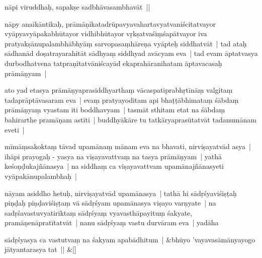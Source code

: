 \documentclass[article,12pt,a4paper]{memoir}%
\newcounter{parCount}
\begin{document}
	  
	  \pstart \leavevmode%
	\label{thakur75-101.28}nāpi viruddhaḥ, sapakṣe sadbhāvasambhavāt ||
	{}
	\pend%
      

	  
	  \pstart \leavevmode%
	\label{thakur75-101.29}nāpy anaikāntikaḥ, prāmāṇikatadrūpavyavahartavyatvaniścitatvayor vyāpyavyāpakabhūtayor vidhibhūtayor vṛkṣatvaśiṃśapātvayor iva pratyakṣānupalambhābhyāṃ sarvopasaṃhāreṇa vyāpteḥ siddhatvāt | tad ataḥ sādhanād doṣatrayarahitāt sādhyaṃ siddhyad avācyam eva | tad evam āptatvasya durbodhatvena tatpraṇītatvāniścayād ekaprahāranihatam āptavacasaḥ prāmāṇyam |
	{}
	\pend%
      

	  
	  \pstart \leavevmode%
	\label{thakur75-102.4}ato yad etasya prāmāṇyaprasiddhyarthaṃ vācaspatiprabhṛtīnāṃ valgitaṃ tadaprāptāvasaram eva | evaṃ pratyayoditam api bhaṭṭābhimataṃ śābdaṃ prāmāṇyaṃ vyastam iti boddhavyam | tasmāt sthitam etat na śābdaṃ bahirarthe pramāṇam astīti | buddhyākāre tu tatkāryaprasūtatvāt tadanumānam eveti |
	{}
	\pend%
      

	  
	  \pstart \leavevmode%
	\label{thakur75-102.7}mīmāṃsakoktaṃ tāvad upamānaṃ mānam eva na bhavati, nirviṣayatvād asya | ihāpi prayogaḥ - yasya na viṣayavattvaṃ na tasya prāmāṇyam | yathā keśoṇḍukajñānasya | na siddhaṃ ca viṣayavattvam upamānajñānasyeti vyāpakānupalambhaḥ |
	{}
	\pend%
      

	  
	  \pstart \leavevmode%
	\label{thakur75-102.11}nāyam asiddho hetuḥ, nirviṣayatvād upamānasya | tathā hi sādṛśyaviśiṣṭaḥ piṇḍaḥ piṇḍaviśiṣṭaṃ vā sādṛśyam upamānasya viṣayo varṇyate | na sadṛśavastuvyatiriktaṃ sādṛśyaṃ vyavasthāpayituṃ śakyate, pramāṇenāpratītatvāt | \label{thakur75-102.14} nanu sādṛśyaṃ vastu durvāram eva | yadāha
	{}
	\pend%
      
	    
	    \stanza[\smallbreak]
	  sādṛśyasya ca vastutvaṃ na śakyam apabādhitum | &bhūyo 'vayavasāmānyayogo jātyantarasya tat || \&[\smallbreak]
	  
\end{document}
